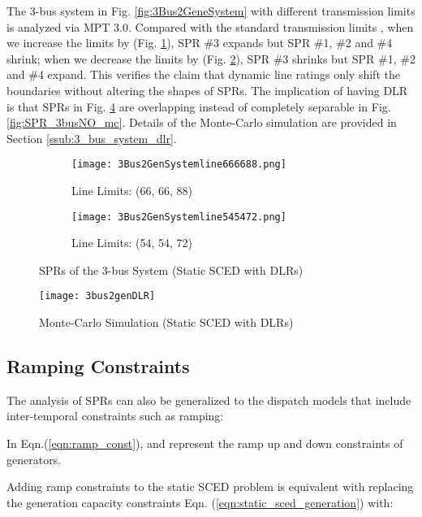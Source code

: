 \documentclass[letterpaper, 11pt]{article}
\theoremstyle{plain}
\theoremstyle{definition}
\begin{document}
The 3-bus system in Fig. \ref{fig:3Bus2GeneSystem} with different transmission limits is analyzed via MPT 3.0. Compared with the standard transmission limits , when we increase the limits by  (Fig. \ref{fig:line_11}), SPR \#3 expands but SPR \#1, \#2 and \#4 shrink; when we decrease the limits by  (Fig. \ref{fig:line_09}), SPR \#3 shrinks but SPR \#1, \#2 and \#4 expand.
This verifies the claim that dynamic line ratings only shift the boundaries without altering the shapes of SPRs. 
The implication of having DLR is that SPRs in Fig. \ref{fig:spr_3bus_dlr_mc} are overlapping instead of completely separable in Fig. \ref{fig:SPR_3busNO_mc}. Details of the Monte-Carlo simulation are provided in Section \ref{ssub:3_bus_system_dlr}.

\begin{figure}[htbp]
  \centering
\begin{subfigure}[t]{0.49\linewidth}
  \centering
  \texttt{[image: 3Bus2GenSystemline666688.png]} 
  \caption{Line Limits: (66, 66, 88)}
  \label{fig:line_11}
  \end{subfigure}
  \begin{subfigure}[t]{0.49\linewidth}
  \centering
  \texttt{[image: 3Bus2GenSystemline545472.png]} 
  \caption{Line Limits: (54, 54, 72)}
  \label{fig:line_09}
  \end{subfigure}  
\caption{SPRs of the 3-bus System (Static SCED with DLRs)}
  \label{fig:SPR_3bus_dlr}
\end{figure}

\begin{figure}[htbp]
  \centering
  \texttt{[image: 3bus2genDLR]}
  \caption{Monte-Carlo Simulation (Static SCED with DLRs)}
  \label{fig:spr_3bus_dlr_mc}
\end{figure}






\subsection{Ramping Constraints} \label{sub:ramping_constraints}
The analysis of SPRs can also be generalized to the dispatch models that include inter-temporal constraints such as ramping:

In Eqn.(\ref{eqn:ramp_const}),  and  represent the ramp up and down constraints of generators.


Adding ramp constraints to the static SCED problem is equivalent with replacing the generation capacity constraints Eqn. (\ref{eqn:static_sced_generation}) with:
\end{document}
